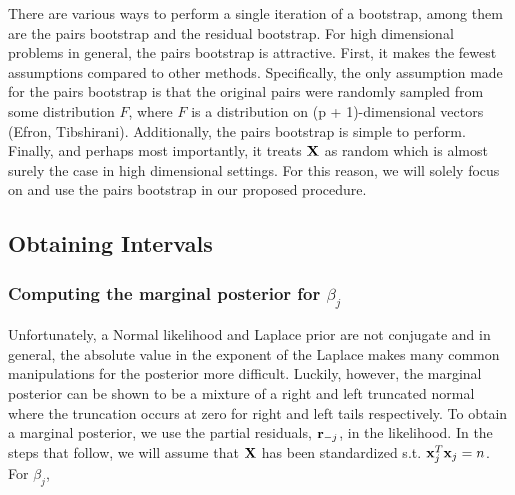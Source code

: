 There are various ways to perform a single iteration of a bootstrap, among them are the pairs bootstrap and the residual bootstrap. For high dimensional problems in general, the pairs bootstrap is attractive. First, it makes the fewest assumptions compared to other methods. Specifically, the only assumption made for the pairs bootstrap is that the original pairs were randomly sampled from some distribution $F$, where $F$ is a distribution on (p + 1)-dimensional vectors (Efron, Tibshirani). Additionally, the pairs bootstrap is simple to perform. Finally, and perhaps most importantly, it treats $\mathbf{X}$ as random which is almost surely the case in high dimensional settings. For this reason, we will solely focus on and use the pairs bootstrap in our proposed procedure.

\subsection{Obtaining Intervals}

\subsubsection{Computing the marginal posterior for $\beta_j$}


Unfortunately, a Normal likelihood and Laplace prior are not conjugate and in general, the absolute value in the exponent of the Laplace makes many common manipulations for the posterior more difficult. Luckily, however, the marginal posterior can be shown to be a mixture of a right and left truncated normal where the truncation occurs at zero for right and left tails respectively. To obtain a marginal posterior, we use the partial residuals, $\mathbf{r}_{-j}$, in the likelihood. In the steps that follow, we will assume that $\mathbf{X}$ has been standardized s.t. $\mathbf{x}_j^T\mathbf{x}_j = n$. For $\beta_j$,

